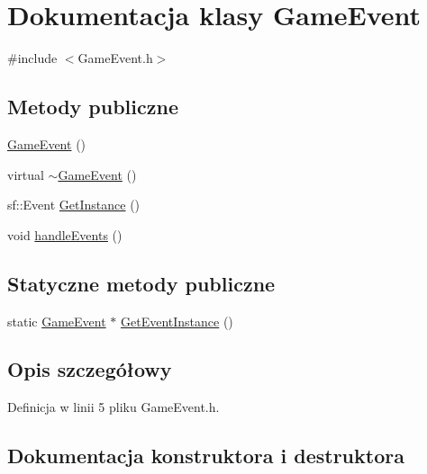\hypertarget{class_game_event}{}\section{Dokumentacja klasy Game\+Event}
\label{class_game_event}


{\ttfamily \#include $<$Game\+Event.\+h$>$}

\subsection*{Metody publiczne}
\begin{DoxyCompactItemize}
\item 
\mbox{\hyperlink{class_game_event_a0a8133b65ffc98712879d18186ef3020}{Game\+Event}} ()
\item 
virtual \mbox{\hyperlink{class_game_event_aaf514ed35c80bbbcc54ce411d9d71eef}{$\sim$\+Game\+Event}} ()
\item 
sf\+::\+Event \mbox{\hyperlink{class_game_event_adbf21138a4eb40624a0f40b2ff75f6db}{Get\+Instance}} ()
\item 
void \mbox{\hyperlink{class_game_event_a73a56d31069079123f03f20855cb9bf0}{handle\+Events}} ()
\end{DoxyCompactItemize}
\subsection*{Statyczne metody publiczne}
\begin{DoxyCompactItemize}
\item 
static \mbox{\hyperlink{class_game_event}{Game\+Event}} $\ast$ \mbox{\hyperlink{class_game_event_a683bf5025fe1a31263cb96059fc9e5a5}{Get\+Event\+Instance}} ()
\end{DoxyCompactItemize}


\subsection{Opis szczegółowy}


Definicja w linii 5 pliku Game\+Event.\+h.



\subsection{Dokumentacja konstruktora i destruktora}
\mbox{\label{class_game_event_a0a8133b65ffc98712879d18186ef3020}} 
